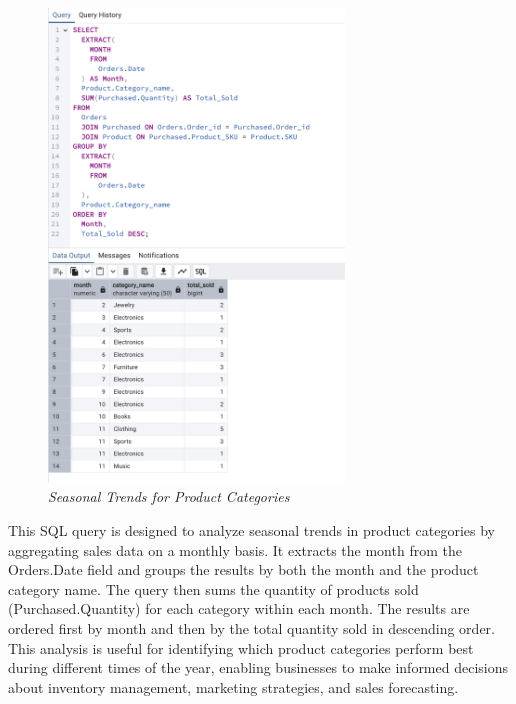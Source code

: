 


\begin{figure}[H]
  \centering
  \includegraphics[width=0.7\textwidth]{images/sql/complex-queries/seasonal_trends_for_product_categories.png}
  \caption{\textit{Seasonal Trends for Product Categories}}
\end{figure}

This SQL query is designed to analyze seasonal trends in product categories by aggregating sales data on a monthly basis. It extracts the month from the Orders.Date field and groups the results by both the month and the product category name. The query then sums the quantity of products sold (Purchased.Quantity) for each category within each month. The results are ordered first by month and then by the total quantity sold in descending order. This analysis is useful for identifying which product categories perform best during different times of the year, enabling businesses to make informed decisions about inventory management, marketing strategies, and sales forecasting.

